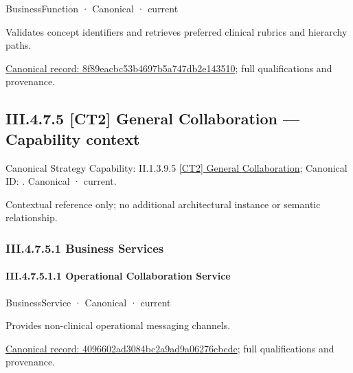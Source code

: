 \label{element:8f89eacbc53b4697b5a747db2e143510}
{\small BusinessFunction · Canonical · current}\par

Validates concept identifiers and retrieves preferred clinical rubrics and hierarchy paths.


{\footnotesize \href{../../../../continuum/business/business-function/8f89eacbc53b4697b5a747db2e143510.md}{Canonical record: 8f89eacbc53b4697b5a747db2e143510}; full qualifications and provenance.}\par
\subsection*{III.4.7.5 [CT2] General Collaboration — Capability context}
\label{navigation:III.4.7.5}

{\small Canonical Strategy Capability: II.1.3.9.5 \hyperref[element:3bb740e6db284112b054905c0c6c80be]{[CT2] General Collaboration}; Canonical ID: \texttt{}. Canonical · current.}\par
Contextual reference only; no additional architectural instance or semantic relationship.\par
\subsubsection*{III.4.7.5.1 Business Services}
\label{navigation:III.4.7.5.1}

\paragraph*{III.4.7.5.1.1 Operational Collaboration Service}
\label{navigation:III.4.7.5.1.1}

\label{element:4096602ad3084bc2a9ad9a06276cbcdc}
{\small BusinessService · Canonical · current}\par

Provides non-clinical operational messaging channels.


{\footnotesize \href{../../../../continuum/business/business-service/4096602ad3084bc2a9ad9a06276cbcdc.md}{Canonical record: 4096602ad3084bc2a9ad9a06276cbcdc}; full qualifications and provenance.}\par
